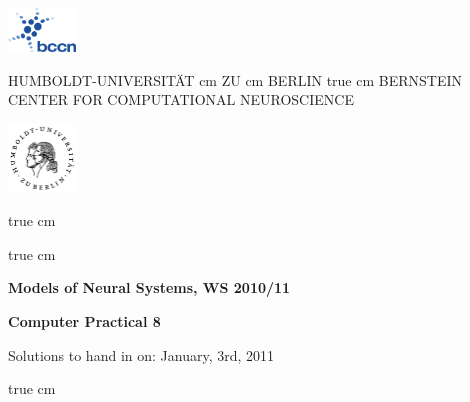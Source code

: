 \documentclass[12pt]{article}
\begin{document}
\parbox{2cm}{
\includegraphics[width=1.8cm]{bccnlogo.pdf}
}
\parbox{11cm}{
\begin{center}
\large HUMBOLDT-UNIVERSIT\"AT  cm ZU  cm BERLIN
 true cm
\mgross BERNSTEIN CENTER FOR COMPUTATIONAL NEUROSCIENCE
\end{center}
}
\parbox{2cm}
{
\hfill
\includegraphics[width=1.8cm]{hublogo.pdf}
}

 true cm



 true cm
\centerline{\bf Models of Neural Systems, WS 2010/11}
\centerline{\bf Computer Practical 8}
\centerline{Solutions to hand in on: January, 3rd, 2011}



 true cm
\end{document}
